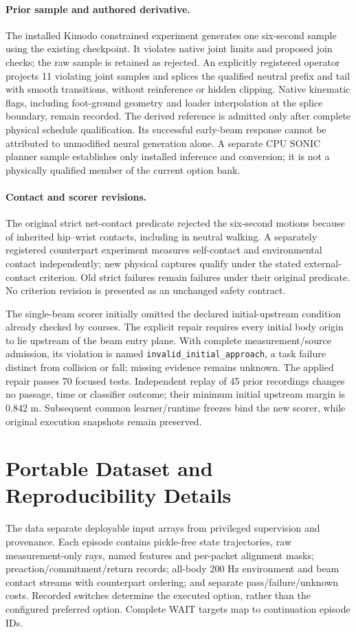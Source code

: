 \paragraph{Prior sample and authored derivative.}
The installed Kimodo constrained experiment generates one six-second sample
using the existing checkpoint. It violates native joint limits and proposed join
checks; the raw sample is retained as rejected. An explicitly registered operator
projects 11 violating joint samples and splices the qualified neutral prefix and
tail with smooth transitions, without reinference or hidden clipping. Native
kinematic flags, including foot-ground geometry and loader interpolation at the
splice boundary, remain recorded. The derived reference is admitted only after
complete physical schedule qualification. Its successful early-beam response
cannot be attributed to unmodified neural generation alone. A separate CPU SONIC
planner sample establishes only installed inference and conversion; it is not a
physically qualified member of the current option bank.

\paragraph{Contact and scorer revisions.}
The original strict net-contact predicate rejected the six-second motions because
of inherited hip--wrist contacts, including in neutral walking. A separately
registered counterpart experiment measures self-contact and environmental contact
independently; new physical captures qualify under the stated external-contact
criterion. Old strict failures remain failures under their original predicate.
No criterion revision is presented as an unchanged safety contract.

The single-beam scorer initially omitted the declared initial-upstream condition
already checked by courses. The explicit repair requires every initial body origin
to lie upstream of the beam entry plane. With complete measurement/source
admission, its violation is named \texttt{invalid\_initial\_approach}, a task
failure distinct from collision or fall; missing evidence remains unknown.
The applied repair passes 70 focused tests. Independent replay of 45 prior
recordings changes no passage, time or classifier outcome; their minimum initial
upstream margin is 0.842 m. Subsequent common learner/runtime freezes bind the
new scorer, while original execution snapshots remain preserved.

\section{Portable Dataset and Reproducibility Details}
\label{app:data}
The data separate deployable input arrays from privileged supervision and
provenance. Each episode contains pickle-free state trajectories, raw
measurement-only rays, named features and per-packet alignment masks;
preaction/commitment/return records; all-body 200 Hz environment and beam contact
streams with counterpart ordering; and separate pass/failure/unknown costs.
Recorded switches determine the executed option, rather than the configured
preferred option. Complete WAIT targets map to continuation episode IDs.

